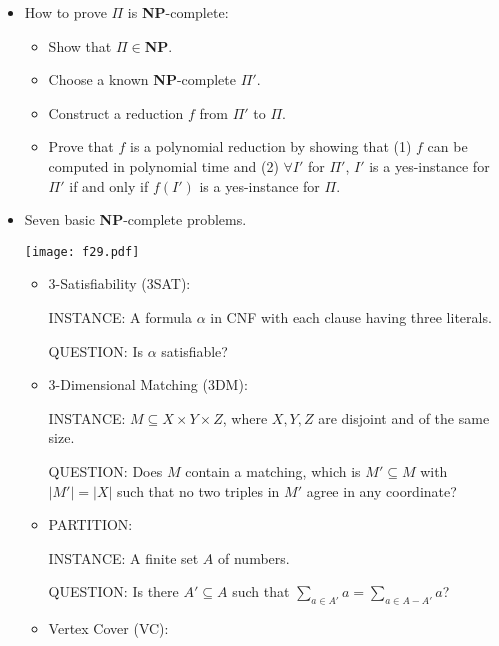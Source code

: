 \documentclass{article}
\begin{document}
\begin{itemize}

\item How to prove $\Pi$ is {\bf NP}-complete:

\begin{itemize}

\item Show that $\Pi\in${\bf NP}.

\item Choose a known {\bf NP}-complete $\Pi'$.

\item Construct a reduction $f$ from $\Pi'$ to $\Pi$.

\item Prove that $f$ is a polynomial reduction by showing that
(1) $f$ can be computed in polynomial time and (2) $\forall I'$ for
$\Pi'$, $I'$ is a yes-instance for $\Pi'$ if and only if $f(I')$ is
a yes-instance for $\Pi$.

\end{itemize}

\item Seven basic {\bf NP}-complete problems.

\vskip 0.25cm
\begin{center}
\texttt{[image: f29.pdf]}
\end{center}

\begin{itemize}

\item 3-Satisfiability (3SAT):

INSTANCE: A formula $\alpha$ in CNF with each clause having
three literals.

QUESTION: Is $\alpha$ satisfiable?

\item 3-Dimensional Matching (3DM):

INSTANCE: $M\subseteq X\times Y\times Z$, where $X,Y,Z$ are disjoint and 
of the same size.

QUESTION: Does $M$ contain a matching, which is $M'\subseteq M$ with
$|M'|=|X|$ such that no two triples in $M'$ agree in any coordinate?

\item PARTITION:

INSTANCE: A finite set $A$ of numbers.

QUESTION: Is there $A'\subseteq A$ such that $\sum_{a\in A'}a=
\sum_{a\in A-A'}a$?

\item Vertex Cover (VC):


\end{itemize}
\end{itemize}
\end{document}
